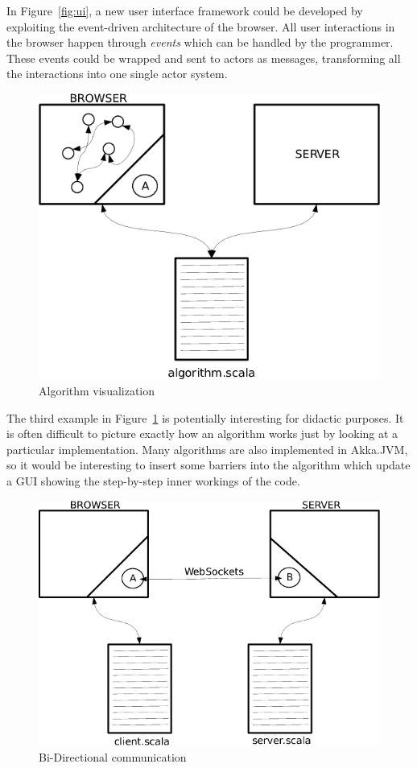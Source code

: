 \documentclass{sig-alternate}
\begin{document}
In Figure~\ref{fig:ui}, a new user interface framework could be developed by exploiting the event-driven
architecture of the browser. All user interactions in the browser happen through \emph{events}
which can be handled by the programmer. These events could be wrapped and sent to actors as messages,
transforming all the interactions into one single actor system.

\begin{figure}
\centering
\includegraphics[scale=0.3]{3.png}
\caption{Algorithm visualization}
\label{fig:algorithm}
\end{figure}

The third example in Figure~\ref{fig:algorithm} is potentially interesting for didactic purposes.
It is often difficult to picture exactly how an algorithm works just by looking at a particular implementation.
Many algorithms are also implemented
in Akka.JVM, so it would be interesting to insert some barriers into the algorithm which update a
GUI showing the step-by-step inner workings of the code.

\begin{figure}
\centering
\includegraphics[scale=0.3]{4.png}
\caption{Bi-Directional communication}
\label{fig:communication}
\end{figure}
\end{document}
